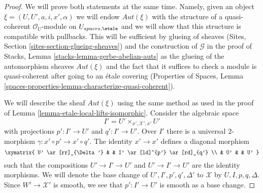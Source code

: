 \begin{proof}
We will prove both statements at the same time. Namely, given
an object $\xi = (U, U', a, i, x', \alpha)$ we will endow
$\mathit{Aut}(\xi)$ with the structure of a
quasi-coherent $\mathcal{O}_U$-module on $U_{spaces, \etale}$ and
we will show that this structure is compatible with pullbacks.
This will be sufficient by glueing of sheaves
(Sites, Section \ref{sites-section-glueing-sheaves})
and the construction of $\mathcal{G}$ in the proof of
Stacks, Lemma \ref{stacks-lemma-gerbe-abelian-auts}
as the glueing of the automorphism sheaves $\mathit{Aut}(\xi)$
and the fact that it suffices to check a module is
quasi-coherent after going to an \'etale covering
(Properties of Spaces, Lemma
\ref{spaces-properties-lemma-characterize-quasi-coherent}).

\medskip\noindent
We will describe the sheaf $\mathit{Aut}(\xi)$ using the
same method as used in the proof of
Lemma \ref{lemma-etale-local-lifts-isomorphic}.
Consider the algebraic space
$$
I' = U' \times_{x', \mathcal{X}', x'} U'
$$
with projections $p' : I' \to U'$ and $q' : I' \to U'$.
Over $I'$ there is a universal $2$-morphism
$\gamma : x' \circ p' \to x' \circ q'$.
The identity $x' \to x'$ defines a diagonal morphism
$$
\xymatrix{
U' \ar[rr]_{\Delta'} & & I' \ar[ld]^{p'} \ar[rd]_{q'} \\
& U' & & U'
}
$$
such that the compositions $U' \to I' \to U'$ and $U' \to I' \to U'$
are the identity morphisms. We will denote the base change of
$U', I', p', q', \Delta'$ to $\mathcal{X}$ by $U, I, p, q, \Delta$.
Since $W' \to \mathcal{X}'$ is smooth, we see that $p' : I' \to U'$
is smooth as a base change.


\end{proof}
